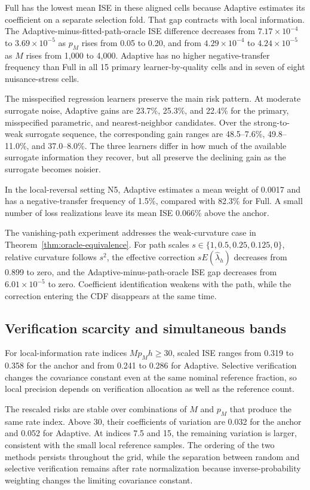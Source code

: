 Full has the lowest mean ISE in these aligned cells because Adaptive estimates
its coefficient on a separate selection fold. That gap contracts with local
information. The Adaptive-minus-fitted-path-oracle ISE difference decreases
from \(7.17\times10^{-4}\) to \(3.69\times10^{-5}\) as \(p_M\) rises from 0.05
to 0.20, and from \(4.29\times10^{-4}\) to \(4.24\times10^{-5}\) as \(M\)
rises from 1,000 to 4,000. Adaptive has no higher negative-transfer frequency
than Full in all 15 primary learner-by-quality cells and in seven of eight
nuisance-stress cells.

The misspecified regression learners preserve the main risk pattern. At
moderate surrogate noise, Adaptive gains are 23.7\%, 25.3\%, and 22.4\%
for the primary, misspecified parametric, and nearest-neighbor candidates. Over
the strong-to-weak surrogate sequence, the corresponding gain ranges are
48.5--7.6\%, 49.8--11.0\%, and 37.0--8.0\%. The three learners differ in how
much of the available surrogate information they recover, but all preserve the
declining gain as the surrogate becomes noisier.

In the local-reversal setting N5, Adaptive estimates a mean weight of 0.0017
and has a negative-transfer frequency of 1.5\%, compared with 82.3\% for Full.
A small number of loss realizations leave its mean ISE 0.066\% above the
anchor.

The vanishing-path experiment addresses the weak-curvature case in
Theorem~\ref{thm:oracle-equivalence}. For path scales
\(s\in\{1,0.5,0.25,0.125,0\}\), relative curvature follows \(s^2\), the
effective correction \(sE(\widehat\lambda_h)\) decreases from 0.899 to zero,
and the Adaptive-minus-path-oracle ISE gap decreases from
\(6.01\times10^{-5}\) to zero. Coefficient identification weakens with the
path, while the correction entering the CDF disappears at the same time.

\subsection{Verification scarcity and simultaneous bands}

For local-information rate indices \(Mp_Mh\ge30\), scaled ISE ranges from
0.319 to 0.358 for the anchor and from 0.241 to 0.286 for Adaptive. Selective
verification changes the covariance constant even at the same nominal
reference fraction, so local precision depends on verification allocation as
well as the reference count.

The rescaled risks are stable over combinations of \(M\) and \(p_M\) that
produce the same rate index. Above 30, their coefficients of variation are
0.032 for the anchor and 0.052 for Adaptive. At indices 7.5 and 15, the
remaining variation is larger, consistent with the small local reference
samples. The ordering of the two methods persists throughout the grid, while
the separation between random and selective verification remains after rate
normalization because inverse-probability weighting changes the limiting
covariance constant.

